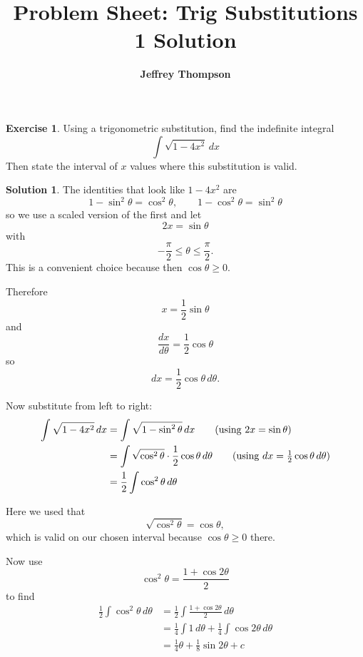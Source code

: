 \documentclass[a4paper]{article}
\theoremstyle{plain}
\theoremstyle{definition}
\newtheorem*{solution}{Solution}
\newtheorem{exercise}{Exercise}
\numberwithin{equation}{subsection}
\begin{document}
\title{\textbf{Problem Sheet: Trig Substitutions 1 Solution}}
\author{\textbf{Jeffrey Thompson}}
\maketitle

\begin{exercise}
Using a trigonometric substitution, find the indefinite integral
\[
    \int \sqrt{1 - 4x^2} \, dx
\]
Then state the interval of $x$ values where this substitution is valid.
\end{exercise}

\begin{solution}

The identities that look like $1-4x^2$ are
\[
    1-\sin^2\theta=\cos^2\theta, \qquad 1-\cos^2\theta=\sin^2\theta
\]
so we use a scaled version of the first and let
\[
    2x = \sin \theta
\]
with
\[
    -\frac{\pi}{2} \leq \theta \leq \frac{\pi}{2}.
\]
This is a convenient choice because then $\cos\theta \geq 0$.

Therefore
\[
    x = \frac{1}{2}\sin \theta
\]
and
\[
    \frac{dx}{d\theta} = \frac{1}{2}\cos \theta
\]
so
\[
    dx = \frac{1}{2}\cos \theta \, d\theta.
\]

Now substitute from left to right:
\begin{align*}
    \int \sqrt{1 - 4x^2} \, dx
    &= \int \sqrt{1 - \sin^2 \theta} \, dx \tag{using $2x = \sin \theta$}\\
    &= \int \sqrt{\cos^2 \theta}\cdot \frac{1}{2}\cos \theta \, d\theta \tag{using $dx = \frac{1}{2}\cos \theta\,d\theta$}\\
    &= \frac{1}{2}\int \cos^2 \theta \, d\theta
\end{align*}

Here we used that
\[
    \sqrt{\cos^2\theta} = \cos\theta,
\]
which is valid on our chosen interval because $\cos\theta \geq 0$ there.

Now use
\[
    \cos^2 \theta = \frac{1+\cos 2\theta}{2}
\]
to find
\begin{align*}
    \frac{1}{2}\int \cos^2 \theta \, d\theta
    &= \frac{1}{2}\int \frac{1+\cos 2\theta}{2}\,d\theta\\
    &= \frac{1}{4}\int 1\,d\theta + \frac{1}{4}\int \cos 2\theta\,d\theta\\
    &= \frac{1}{4}\theta + \frac{1}{8}\sin 2\theta + c
\end{align*}


\end{solution}
\end{document}

